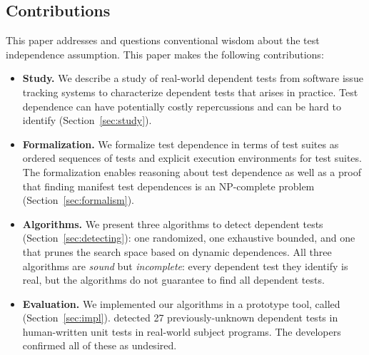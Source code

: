 \subsection{Contributions}
\label{sec:contributions}

This paper addresses and questions
conventional wisdom about the test independence assumption. 
This paper makes the following contributions:

\begin{itemize}

  \item \textbf{Study.} We describe a study of \dtnum real-world
  dependent tests from \repnum software issue tracking
  systems to characterize dependent tests that
  arises in practice.  Test dependence can have
  potentially costly repercussions and can be hard to identify
  (Section~\ref{sec:study}).

\item \textbf{Formalization.} We formalize test dependence
  in terms of test suites as ordered sequences of tests and explicit execution
  environments for test suites.  The formalization enables reasoning about test dependence
  as well as a proof that finding manifest test dependences is an NP-complete
  problem (Section~\ref{sec:formalism}).

  \item \textbf{Algorithms.} We present three algorithms
  to detect dependent tests (Section~\ref{sec:detecting}):
  one randomized, one exhaustive bounded, and one that prunes the search
  space based on dynamic dependences.
  All three algorithms are \emph{sound} but \emph{incomplete}:
  every dependent test they identify is real, but the algorithms
  do not guarantee to find all dependent tests. 

  \item \textbf{Evaluation.} We implemented our algorithms in a prototype
  tool, called \ourtool (Section~\ref{sec:impl}).
  \ourtool detected 27 previously-unknown dependent tests in human-written
  unit tests in \subjnum real-world subject programs.
  The developers confirmed all of these as
  undesired.

\end{itemize}



